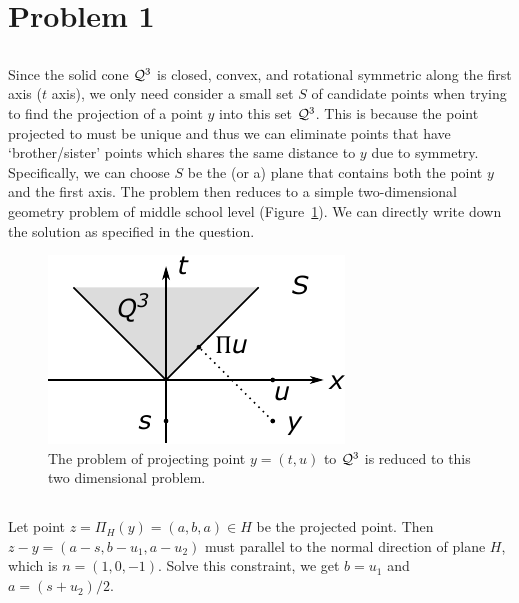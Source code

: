 \section{Problem 1}

\subsection{} %

Since the solid cone $\mathcal{Q}^3$ is closed, convex,
and rotational symmetric along the first axis ($t$ axis),
we only need consider a small set $S$ of candidate points
when trying to find the projection of a point $y$ into this set $\mathcal{Q}^3$.
This is because the point projected to must be unique
and thus we can eliminate points that have `brother/sister' points which
shares the same distance to $y$ due to symmetry.
Specifically, we can choose $S$ be the (or a) plane that contains
both the point $y$ and the first axis.
The problem then reduces to a simple two-dimensional geometry problem
of middle school level (Figure~\ref{fig:1}).
We can directly write down the solution as specified in the question.

\begin{figure}[ht]
\centering
    \includegraphics[width=0.36\linewidth]{figure/fig1}
    \caption{\small
    The problem of projecting point $y=(t,u)$ to $\mathcal{Q}^3$ is
    reduced to this two dimensional problem.}
    \label{fig:1}
\end{figure}

\subsection{} %

Let point $z=\Pi_H(y)=(a,b,a)\in H$ be the projected point.
Then $z-y=(a-s, b-u_1, a-u_2)$ must parallel to the normal direction of plane $H$,
which is $n=(1,0,-1)$.
Solve this constraint,
we get $b=u_1$ and $a=(s+u_2)/2$.
